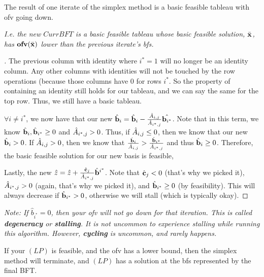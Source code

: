 \begin{theo}{}{}
The result of one iterate of the simplex method is a basic feasible tableau with
ofv going down.

\medskip
\textit{I.e. the new $CurrBFT$ is a basic feasible tableau whose basic feasible
solution, $\bar{\mathbf{x}}$, has $\textbf{ofv}(\bar{\mathbf{x}})$ lower than the previous iterate's
bfs.}
\end{theo}

\begin{proof}[]

The previous column with identity where $i^*=1$ will no longer be an identity 
column.  Any other columns with 
identities will not be touched by the row operations (because those
columns have $0$ for rows $i^*$. So the property of containing an 
identity still holds for our tableau, and we can say the same for the
top row. Thus, we still have a basic tableau.


$\forall i \neq i^*$, we now have that our new $\hat{\mathbf{b}}_i = 
\hat{\mathbf{b}}_i - \frac{\hat{A}_{i,j}}{\hat{A}_{i^*,j}}\hat{\mathbf{b}_{i^*}}$.
Note that in this term, we know $\hat{\mathbf{b}}_i, \hat{\mathbf{b}}_{i^*} \geq 0$
and $\hat{A}_{i^*,j} > 0$. Thus, if $\hat{A}_{i,j} \leq 0$, then we
know that our new $\hat{\mathbf{b}}_i > 0$. If $\hat{A}_{i,j} > 0$, then we
know that $\frac{\hat{\mathbf{b}}_i}{\hat{A}_{i,j}} > 
\frac{\hat{\mathbf{b}}_{i^*}}{\hat{A}_{i^*,j}}$ and thus 
$\hat{\mathbf{b}}_i \geq 0$. Therefore, the basic feasible solution for our
new basis is feasible, 

Lastly, the new $\hat{z} = \hat{z} + 
\frac{\hat{\mathbf{c}}_j}{\hat{A}_{i^*,j}}\hat{\mathbf{b}}^{i^*}$. Note that
$\hat{\mathbf{c}}_j < 0$ (that's why we picked it), $\hat{A}_{i^*,j} > 0$
(again, that's why we picked it), and $\hat{\mathbf{b}}_{i^*} \geq 0$ (by
feasibility). This will always decrease if $\hat{\mathbf{b}}_{i^*} > 0$,
otherwise we will stall (which is typically okay).
\end{proof}

\textit{Note: If $\hat{b}_{i^*} = 0$, then your ofv will not go down for that 
iteration. This is called \textbf{degeneracy} or \textbf{stalling}. It is not
uncommon to experience stalling while running this algorithm. However, 
\textbf{cycling} \textit{is} uncommon, and rarely happens.}

\begin{theo}{}{}
If your $(LP)$ is feasible, and the ofv has a lower bound, then the simplex 
method will terminate, and $(LP)$ has a solution at the bfs represented by the
final BFT.
\end{theo}


